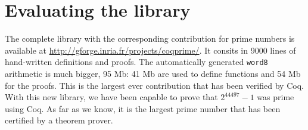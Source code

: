 \section{Evaluating the library \label{bench}}

The complete library with the corresponding contribution for prime numbers is available at \url{http://gforge.inria.fr/projects/coqprime/}. It consits in 9000 lines of hand-written
definitions and proofs. The automatically generated {\tt word8} arithmetic is much bigger,
95 Mb: 41 Mb are used to define functions and 54 Mb for the proofs. This is the largest ever
contribution that has been verified by {\sc Coq}. With this new library, we have been capable to
prove that $2^{44497} - 1$ was prime using {\sc Coq}. As far as we know, it is the largest 
prime number  that has been certified by a theorem prover.

